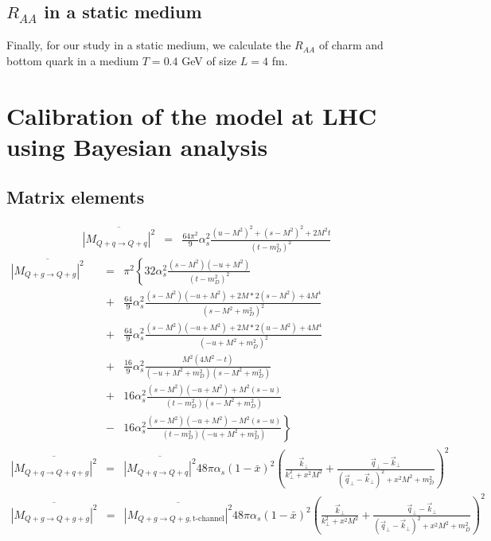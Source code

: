 \documentclass[aps, prc, reprint, amsmath, groupedaddress, nofootinbib]{revtex4-1}
\begin{document}
\subsection{$R_{AA}$ in a static medium}
Finally, for our study in a static medium, we calculate the $R_{AA}$ of charm and bottom quark in a medium $T=0.4$ GeV of size $L=4$ fm.

\section{Calibration of the model at LHC using Bayesian analysis}


\begin{appendices}
\section{Matrix elements}
\label{appendix:matrix-element}
\begin{widetext}
\begin{eqnarray}
\overline{|M_{Q+q\rightarrow Q+q}|^2} &=& \frac{64\pi^2}{9}\alpha_s^2 \frac{(u-M^2)^2 + (s-M^2)^2 + 2 M^2 t}{(t-m_D^2)^2}
\end{eqnarray}
\begin{eqnarray}
\overline{|M_{Q+g\rightarrow Q+g}|^2} &=& \pi^2 \left\{
32\alpha_s^2 \frac{(s-M^2)(-u+M^2)}{(t-m_D^2)^2} \right. \\ \nonumber
&+&\frac{64}{9}\alpha_s^2 \frac{(s-M^2)(-u+M^2)+2M*2(s-M^2) + 4M^4}{(s-M^2+m_D^2)^2} \\ \nonumber
&+&\frac{64}{9}\alpha_s^2 \frac{(s-M^2)(-u+M^2)+2M*2(u-M^2) + 4M^4}{(-u+M^2+m_D^2)^2} \\ \nonumber
&+&\frac{16}{9}\alpha_s^2 \frac{M^2(4M^2 - t)}{(-u+M^2+m_D^2)(s-M^2+m_D^2)} \\ \nonumber
&+& 16 \alpha_s^2 \frac{(s-M^2)(-u+M^2)+M^2(s-u)}{(t-m_D^2)(s-M^2+m_D^2)} \\ \nonumber
&-& \left. 16 \alpha_s^2 \frac{(s-M^2)(-u+M^2)-M^2(s-u)}{(t-m_D^2)(-u+M^2+m_D^2)}\right\} \\
\overline{|M_{Q+q\rightarrow Q+q+g}|^2} &=& \overline{|M_{Q+q\rightarrow Q+q}|^2} 48 \pi \alpha_s (1-\bar{x})^2 \left(\frac{\vec{k}_\perp}{k_\perp^2 + x^2 M^2} 
+ \frac{\vec{q}_\perp - \vec{k}_\perp}{(\vec{q}_\perp-\vec{k}_\perp)^2 + x^2 M^2 + m_D^2}
\right)^2 
\end{eqnarray}
\begin{eqnarray}
\overline{|M_{Q+g\rightarrow Q+g+g}|^2} &=& \overline{|M_{Q+g\rightarrow Q+g, \textrm{t-channel}}|^2} 48 \pi \alpha_s (1-\bar{x})^2 \left(\frac{\vec{k}_\perp}{k_\perp^2 + x^2 M^2} 
+ \frac{\vec{q}_\perp - \vec{k}_\perp}{(\vec{q}_\perp-\vec{k}_\perp)^2 + x^2 M^2 + m_D^2}
\right)^2 
\end{eqnarray}
\end{widetext}


\end{appendices}
\end{document}
